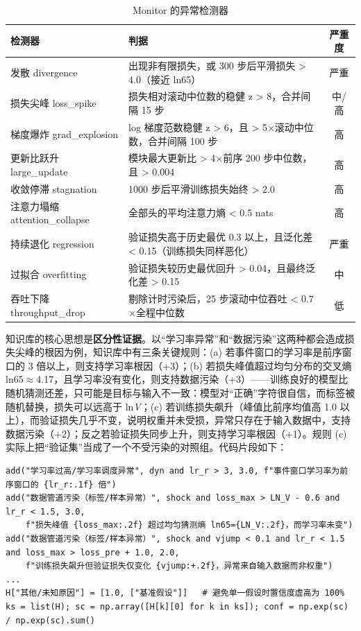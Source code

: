 \begin{table}[htbp]
\centering
\caption{Monitor 的异常检测器}
\small
\begin{tabularx}{\linewidth}{XXc}
\toprule
\textbf{检测器} & \textbf{判据} & \textbf{严重度} \\
\midrule
发散 divergence & 出现非有限损失，或 300 步后平滑损失 > 4.0（接近 ln65） & 严重 \\
损失尖峰 loss\_spike & 损失相对滚动中位数的稳健 z > 8，合并间隔 15 步 & 中/高 \\
梯度爆炸 grad\_explosion & log 梯度范数稳健 z > 6，且 > 5$\times$滚动中位数，合并间隔 100 步 & 高 \\
更新比跃升 large\_update & 模块最大更新比 > 4$\times$前序 200 步中位数，且 > 0.004 & 高 \\
收敛停滞 stagnation & 1000 步后平滑训练损失始终 > 2.0 & 高 \\
注意力塌缩 attention\_collapse & 全部头的平均注意力熵 < 0.5 nats & 高 \\
持续退化 regression & 验证损失高于历史最优 0.3 以上，且泛化差 < 0.15（训练损失同样恶化） & 严重 \\
过拟合 overfitting & 验证损失较历史最优回升 > 0.04，且最终泛化差 > 0.15 & 中 \\
吞吐下降 throughput\_drop & 剔除计时污染后，25 步滚动中位吞吐 < 0.7$\times$全程中位数 & 低 \\
\bottomrule
\end{tabularx}
\end{table}

知识库的核心思想是\textbf{区分性证据}。以“学习率异常”和“数据污染”这两种都会造成损失尖峰的根因为例，知识库中有三条关键规则：(a) 若事件窗口的学习率是前序窗口的 3 倍以上，则支持学习率根因（+3）；(b) 若损失峰值超过均匀分布的交叉熵 ln65$\approx$4.17，且学习率没有变化，则支持数据污染（+3）——训练良好的模型比随机猜测还差，只可能是目标与输入不一致：模型对“正确”字符很自信，而标签被随机替换，损失可以远高于 ln\textit{V}；(c) 若训练损失飙升（峰值比前序均值高 1.0 以上），而验证损失几乎不变，说明权重并未受损，异常只存在于输入数据中，支持数据污染（+2）；反之若验证损失同步上升，则支持学习率根因（+1）。规则 (c) 实际上把“验证集”当成了一个不受污染的对照组。代码片段如下：

\begin{Verbatim}[fontsize=\small,frame=single,breaklines,breakanywhere]
add("学习率过高/学习率调度异常", dyn and lr_r > 3, 3.0, f"事件窗口学习率为前序窗口的 {lr_r:.1f} 倍")
add("数据管道污染（标签/样本异常）", shock and loss_max > LN_V - 0.6 and lr_r < 1.5, 3.0,
    f"损失峰值 {loss_max:.2f} 超过均匀猜测熵 ln65={LN_V:.2f}，而学习率未变")
add("数据管道污染（标签/样本异常）", shock and vjump < 0.1 and lr_r < 1.5 and loss_max > loss_pre + 1.0, 2.0,
    f"训练损失飙升但验证损失仅变化 {vjump:+.2f}，异常来自输入数据而非权重")
...
H["其他/未知原因"] = [1.0, ["基准假设"]]   # 避免单一假设时置信度虚高为 100%
ks = list(H); sc = np.array([H[k][0] for k in ks]); conf = np.exp(sc) / np.exp(sc).sum()
\end{Verbatim}

